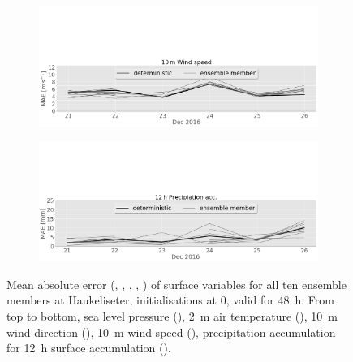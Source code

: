 \begin{figure}[H]
	\centering
	\begin{subfigure}[b]{\textwidth}
		\includegraphics[trim={0cm 0cm 0cm 9.5cm},clip,width=\textwidth]{./fig_sfc_ws/MAE_20161220_26_00}
		\caption{}\label{fig:MAE:ws}
	\end{subfigure}
	\begin{subfigure}[b]{\textwidth}
		\includegraphics[trim={0cm 0cm 0cm 9.5cm},clip,width=\textwidth]{./fig_sfc_precip/MAE_20161220_26_00}
		\caption{}\label{fig:MAE:precip12}
	\end{subfigure}
	\caption{Mean absolute error (\protect{}, \protect{}, \protect{}, \protect{}, \protect{}) of surface variables for all ten ensemble members at Haukeliseter, initialisations at \SI{0}{\UTC}, valid for \SI{48}{\hour}. From top to bottom, sea level pressure (\protect{}), \SI{2}{\metre} air temperature (\protect{}), \SI{10}{\metre} wind direction (\protect{}), \SI{10}{\metre} wind speed (\protect{}), precipitation accumulation for \SI{12}{\hour} surface accumulation (\protect{}).}\label{fig:MAE}
\end{figure}
